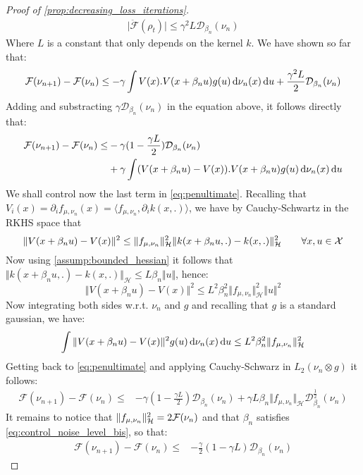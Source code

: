 \begin{proof}[Proof of \cref{prop:decreasing_loss_iterations}]
	\begin{align}\label{eq:upper_bound_1}
	\vert  \ddot{\mathcal{F}}(\rho_t)   \vert\leq \gamma^2 L \mathcal{D}_{\beta_n}(\nu_n) 
	\end{align}
	Where $L$ is a constant that only depends on the kernel $k$. We have shown so far that:
	\[
	\mathcal{F}(\nu_{n+1})-\mathcal{F}(\nu_{n})\leq   -\gamma \int  V(x).V(x+\beta_n u) g(u)\mathop{}\!\mathrm{d}\nu_n(x)\mathop{}\!\mathrm{d} u +  \frac{\gamma^2L}{2}\mathcal{D}_{\beta_n}(\nu_n) 
	\]
	Adding and substracting  $\gamma \mathcal{D}_{\beta_n}(\nu_n)$ in the equation above, it follows directly that:
\begin{align}\label{eq:penultimate}
\begin{split}
			\mathcal{F}(\nu_{n+1})-\mathcal{F}(\nu_{n} )\leq &   -\gamma (1-\frac{\gamma L}{2} )\mathcal{D}_{\beta_n}(\nu_n)
 \\
 &+ \gamma\int  (V(x+\beta_n u) -V(x)).V(x+\beta_n u) g(u)\mathop{}\!\mathrm{d}\nu_n(x)\mathop{}\!\mathrm{d} u	
\end{split}
\end{align}
We shall control now the last term in \cref{eq:penultimate}. Recalling that   $ V_i(x) = \partial_i f_{\mu,\nu_n}(x) = \langle f_{\mu,\nu_n} , \partial_i k(x,.)\rangle $,  we have by Cauchy-Schwartz in the RKHS space that
\[
\Vert V(x+\beta_n u) -V(x)\Vert^2\leq \Vert f_{\mu,\nu_n} \Vert_{\mathcal{H}}^2  \Vert k(x+\beta_n u,.) -k(x,.)\Vert_{\mathcal{H}}^2\qquad \forall x,u \in {{\mathcal X}}
\]
Now using \cref{assump:bounded_hessian} it follows that $\Vert k(x+\beta_n u,.) -k(x,.)\Vert_{\mathcal{H}}\leq L \beta_n \Vert u \Vert  $, hence:
\[
\Vert V(x+\beta_n u) -V(x)\Vert^2 \leq L^2\beta^2_n \Vert f_{\mu,\nu_n} \Vert_{\mathcal{H}}^2 \Vert u \Vert^2
\]
Now integrating both sides w.r.t. $\nu_n$ and $g$ and recalling that $g$ is a standard gaussian, we have:
\begin{align}
	 \int  \Vert V(x+\beta_n u) -V(x)\Vert^2 g(u)\mathop{}\!\mathrm{d}\nu_n(x)\mathop{}\!\mathrm{d} u
\leq 
	L^2\beta^2_n\Vert f_{\mu,\nu_n} \Vert_{\mathcal{H}}^2
\end{align}
Getting back to \cref{eq:penultimate} and applying Cauchy-Schwarz in $L_2(\nu_n\otimes g)$ it follows:
\begin{align}
	\mathcal{F}(\nu_{n+1})-\mathcal{F}(\nu_{n} )\leq &   -\gamma (1-\frac{\gamma L}{2} )\mathcal{D}_{\beta_n}(\nu_n) +\gamma L\beta_n\Vert f_{\mu,\nu_n} \Vert_{\mathcal{H}}\mathcal{D}^{\frac{1}{2}}_{\beta_n}(\nu_n)
\end{align}
It remains to notice that $\Vert f_{\mu,\nu_n} \Vert_{\mathcal{H}}^2 = 2{{\mathcal F}}(\nu_n)$ and that $\beta_n$ satisfies \cref{eq:control_noise_level_bis}, so that:
\begin{align}
	\mathcal{F}(\nu_{n+1})-\mathcal{F}(\nu_{n} )\leq &   -\frac{\gamma}{2} (1-\gamma L )\mathcal{D}_{\beta_n}(\nu_n)
\end{align}
\end{proof}

